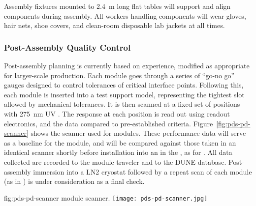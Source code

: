Assembly fixtures mounted to \SI{2.4}{m} long flat tables will %
support and align  components during assembly.  All workers handling  components will wear gloves, hair nets, shoe covers, and clean-room disposable lab jackets at all times.

\subsubsection{Post-Assembly Quality Control}

Post-assembly  planning is currently based on  experience, modified as appropriate for larger-scale production.  Each  module goes through a series of ``go-no go'' gauges 
designed to control tolerances of critical interface points.  Following this, each module is inserted into a test  support model, representing the tightest slot allowed by  mechanical tolerances. %
It is then scanned at a fixed set of positions 
with \SI{275}{nm} UV .  The   response at each position is read out using  readout electronics, and the data compared to pre-established criteria.  Figure~\ref{fig:pds-pd-scanner} shows %
the scanner used for  modules. These performance data will serve as a baseline for the  module, and will be compared against those taken in an identical scanner shortly before installation into an  in the , as for . %
All data collected are recorded to the module traveler and to the DUNE  database.
Post-assembly immersion into a LN2 cryostat followed by a repeat scan of each  module (as in ) is under consideration as a final  check.

\begin{dunefigure}{fig:pds-pd-scanner}
{ module scanner.}
  \texttt{[image: pds-pd-scanner.jpg]}
\end{dunefigure}



